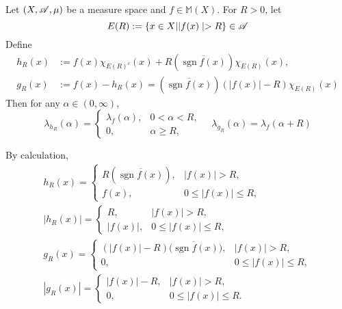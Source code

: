 \begin{prop}\label{prop:distrdecomp}
	Let $(X,\mathscr{A},\mu)$ be a measure space and $f \in \mathbb{M}(X)$. For $R > 0$, let
	\begin{equation*}
		E(R):=\{x \in X| | f(x) \mid>R\} \in \mathscr{A}
	\end{equation*}
	Define
	\begin{equation*}
		\begin{aligned}
			h_R(x)&:=f(x) \chi_{E(R)^c}(x)+R(\overline{\operatorname{sgn} f(x)}) \chi_{E(R)}(x), \\
			g_R(x)&:=f(x)-h_R(x)=(\overline{\operatorname{sgn} f(x)})(|f(x)|-R) \chi_{E(R)}(x)
		\end{aligned}
	\end{equation*}
	Then for any $\alpha \in (0,\infty)$,
	\begin{equation*}
		\lambda_{h_R}(\alpha)= \begin{cases}\lambda_f(\alpha), & 0<\alpha<R,  \\ 0, & \alpha \geq R,\end{cases} \quad \lambda_{g_R}(\alpha)=\lambda_f(\alpha+R)
	\end{equation*}
\end{prop}
\begin{rmk}
	By calculation,
	\begin{equation*}
		\begin{gathered}
			h_R(x)= \begin{cases}R(\overline{\operatorname{sgn} f(x)}), & |f(x)|>R, \\
			f(x), & 0 \leq|f(x)| \leq R,\end{cases} \\
			\left|h_R(x)\right|= \begin{cases}R, & |f(x)|>R, \\
			|f(x)|, & 0 \leq|f(x)| \leq R,\end{cases} \\
			g_R(x)= \begin{cases}(|f(x)|-R) \overline{(\operatorname{sgn} f(x)}), & |f(x)|>R, \\
			0, & 0 \leq|f(x)| \leq R,\end{cases} \\
			\left|g_R(x)\right|= \begin{cases}|f(x)|-R, & |f(x)|>R, \\
			0, & 0 \leq|f(x)| \leq R .\end{cases}
		\end{gathered}
	\end{equation*}
\end{rmk}
